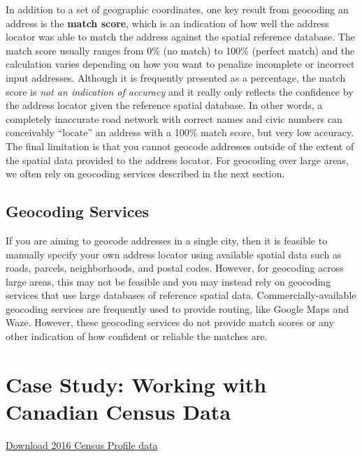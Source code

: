 \documentclass[
]{book}
\begin{document}
In addition to a set of geographic coordinates, one key result from geocoding an address is the \textbf{match score}, which is an indication of how well the address locator was able to match the address against the spatial reference database. The match score usually ranges from 0\% (no match) to 100\% (perfect match) and the calculation varies depending on how you want to penalize incomplete or incorrect input addresses. Although it is frequently presented as a percentage, the match score is \emph{not an indication of accuracy} and it really only reflects the confidence by the address locator given the reference spatial database. In other words, a completely inaccurate road network with correct names and civic numbers can conceivably ``locate'' an address with a 100\% match score, but very low accuracy. The final limitation is that you cannot geocode addresses outside of the extent of the spatial data provided to the address locator. For geocoding over large areas, we often rely on geocoding services described in the next section.

\hypertarget{geocoding-services}{%
\subsection{Geocoding Services}\label{geocoding-services}}

If you are aiming to geocode addresses in a single city, then it is feasible to manually specify your own address locator using available spatial data such as roads, parcels, neighborhoods, and postal codes. However, for geocoding across large areas, this may not be feasible and you may instead rely on geocoding services that use large databases of reference spatial data. Commercially-available geocoding services are frequently used to provide routing, like Google Maps and Waze. However, these geocoding services do not provide match scores or any other indication of how confident or reliable the matches are.

\hypertarget{case-study-working-with-canadian-census-data}{%
\section{Case Study: Working with Canadian Census Data}\label{case-study-working-with-canadian-census-data}}

\href{https://www12.statcan.gc.ca/census-recensement/2016/dp-pd/prof/details/download-telecharger/comp/page_dl-tc.cfm?Lang=E}{Download 2016 Census Profile data}
\end{document}
